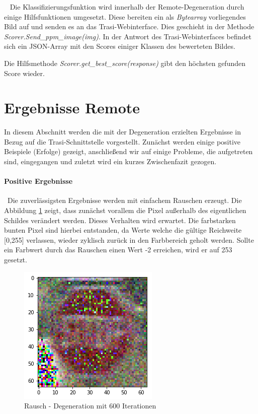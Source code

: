 ~\newline 
Die Klassifizierungsfunktion wird innerhalb der Remote-Degeneration durch einige Hilfsfunktionen umgesetzt. Diese bereiten ein als \textit{Bytearray} vorliegendes Bild auf und senden es an das Trasi-Webinterface. Dies geschieht in der Methode \textit{Scorer.Send\_ppm\_image(img)}. In der Antwort des Trasi-Webinterfaces befindet sich ein JSON-Array mit den Scores einiger Klassen des bewerteten Bildes. 

Die Hilfsmethode \textit{Scorer.get\_best\_score(response)} gibt den höchsten gefunden Score wieder.
\newpage
{}

\section{Ergebnisse Remote}
\label{sec:DegenerationErgebnisse}
In diesem Abschnitt werden die mit der Degeneration erzielten Ergebnisse in Bezug auf die Trasi-Schnittstelle vorgestellt. Zunächst werden einige positive Beispiele (Erfolge) gezeigt, anschließend wir auf einige Probleme, die aufgetreten sind, eingegangen und zuletzt wird ein kurzes Zwischenfazit gezogen. 
\paragraph{Positive Ergebnisse} ~\newline Die zuverlässigsten Ergebnisse werden mit einfachem Rauschen erzeugt. Die Abbildung \ref{fig:stoptiefe600} zeigt, dass zunächst vorallem die Pixel außerhalb des eigentlichen Schildes verändert werden. Dieses Verhalten wird erwartet. Die farbstarken bunten Pixel sind hierbei entstanden, da Werte welche die gültige Reichweite [0,255] verlassen, wieder zyklisch zurück in den Farbbereich geholt werden. Sollte ein Farbwert durch das Rauschen einen Wert -2 erreichen, wird er auf 253 gesetzt.  

\begin{figure}[h]
	\centering
	\includegraphics[width=0.4\linewidth]{Images/DegenSamples/StopTiefe600}
	\caption[Degeneration Tiefe 600]{Rausch - Degeneration mit 600 Iterationen}
	\label{fig:stoptiefe600}
\end{figure}

